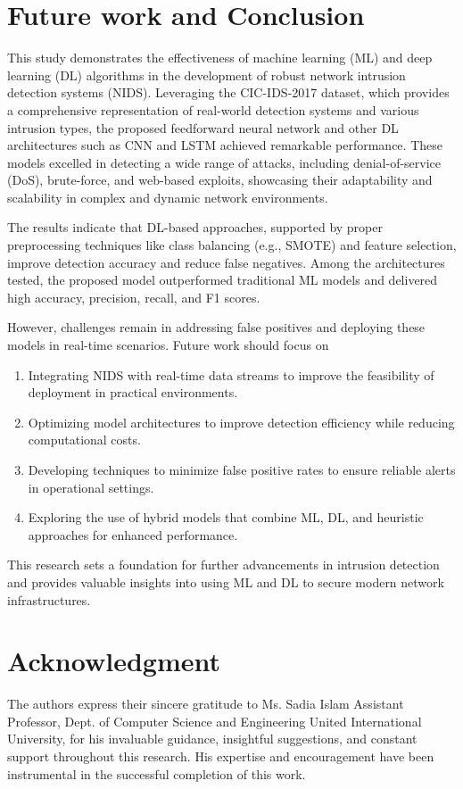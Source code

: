 \documentclass[conference]{IEEEtran}
\begin{document}
\section{Future work and Conclusion}
This study demonstrates the effectiveness of machine learning (ML) and deep learning (DL) algorithms in the development of robust network intrusion detection systems (NIDS). Leveraging the CIC-IDS-2017 dataset, which provides a comprehensive representation of real-world detection systems and various intrusion types, the proposed feedforward neural network and other DL architectures such as CNN and LSTM achieved remarkable performance. These models excelled in detecting a wide range of attacks, including denial-of-service (DoS), brute-force, and web-based exploits, showcasing their adaptability and scalability in complex and dynamic network environments.

The results indicate that DL-based approaches, supported by proper preprocessing techniques like class balancing (e.g., SMOTE) and feature selection, improve detection accuracy and reduce false negatives. Among the architectures tested, the proposed model outperformed traditional ML models and delivered high accuracy, precision, recall, and F1 scores.

However, challenges remain in addressing false positives and deploying these models in real-time scenarios. Future work should focus on
\begin{enumerate}[label=\roman*)]
    \item Integrating NIDS with real-time data streams to improve the feasibility of deployment in practical environments.
    \item Optimizing model architectures to improve detection efficiency while reducing computational costs.
    \item Developing techniques to minimize false positive rates to ensure reliable alerts in operational settings.
    \item Exploring the use of hybrid models that combine ML, DL, and heuristic approaches for enhanced performance.
\end{enumerate}

This research sets a foundation for further advancements in intrusion detection and provides valuable insights into using ML and DL to secure modern network infrastructures.

\section*{Acknowledgment}
The authors express their sincere gratitude to Ms. Sadia Islam
Assistant Professor,
Dept. of Computer Science and Engineering
United International University, for his invaluable guidance, insightful suggestions, and constant support throughout this research. His expertise and encouragement have been instrumental in the successful completion of this work.

    
    
\end{document}
